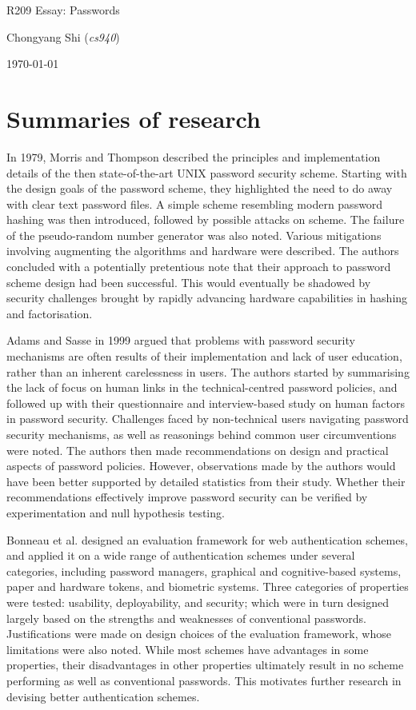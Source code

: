 \documentclass[11pt]{article}
\begin{document}
\centerline{\Large R209 Essay:  Passwords}
\vspace{2em}
\centerline{\large Chongyang Shi (\emph{cs940})}
\vspace{1em}
\centerline{\large \today}
\vspace{1em}

\section{Summaries of research}

In 1979, Morris and Thompson \cite{morris1979password} described the principles and implementation details of the then state-of-the-art UNIX password security scheme. Starting with the design goals of the password scheme, they highlighted the need to do away with clear text password files. A simple scheme resembling modern password hashing was then introduced, followed by possible attacks on scheme. The failure of the pseudo-random number generator was also noted. Various mitigations involving augmenting the algorithms and hardware were described. The authors concluded with a potentially pretentious note that their approach to password scheme design had been successful. This would eventually be shadowed by security challenges brought by rapidly advancing hardware capabilities in hashing and factorisation. 

Adams and Sasse \cite{adams1999users} in 1999 argued that problems with password security mechanisms are often results of their implementation and lack of user education, rather than an inherent carelessness in users. The authors started by summarising the lack of focus on human links in the technical-centred password policies, and followed up with their questionnaire and interview-based study on human factors in password security. Challenges faced by non-technical users navigating password security mechanisms, as well as reasonings behind common user circumventions were noted. The authors then made recommendations on design and practical aspects of password policies. However, observations made by the authors would have been better supported by detailed statistics from their study. Whether their recommendations effectively improve password security can be verified by experimentation and null hypothesis testing. 

Bonneau et al. \cite{bonneau2012quest} designed an evaluation framework for web authentication schemes, and applied it on a wide range of authentication schemes under several categories, including password managers, graphical and cognitive-based systems, paper and hardware tokens, and biometric systems. Three categories of properties were tested: usability, deployability, and security; which were in turn designed largely based on the strengths and weaknesses of conventional passwords. Justifications were made on design choices of the evaluation framework, whose limitations were also noted. While most schemes have advantages in some properties, their disadvantages in other properties ultimately result in no scheme performing as well as conventional passwords. This motivates further research in devising better authentication schemes. 
\end{document}
